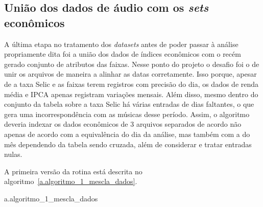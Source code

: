\subsection{União dos dados de áudio com os \textit{sets} econômicos}
\label{c.uniao_economia_audio}

A última etapa no tratamento dos \textit{datasets} antes de poder passar à análise propriamente dita foi a união dos dados de índices econômicos com o recém gerado conjunto de atributos das faixas. Nesse ponto do projeto o desafio foi o de unir os arquivos de maneira a alinhar as datas corretamente. Isso porque, apesar de a taxa Selic e as faixas terem registros com precisão do dia, os dados de renda média e IPCA apenas registram variações mensais. Além disso, mesmo dentro do conjunto da tabela sobre a taxa Selic há várias entradas de dias faltantes, o que gera uma incorrespondência com as músicas desse período. Assim, o algoritmo deveria indexar os dados econômicos de 3 arquivos separados de acordo não apenas de acordo com a equivalência do dia da análise, mas também com a do mês dependendo da tabela sendo cruzada, além de considerar e tratar entradas nulas.

A primeira versão da rotina está descrita no algoritmo~\ref{a.algoritmo_1_mescla_dados}.

\begin{nicealgo}{a.algoritmo_1_mescla_dados}
\naPREAMBLE
{}
\naBODY
\naBEGIN{}
				\naEND{}
			\naEND{}
		\naEND{}
			\naEND{}
		\naEND{}
	\naEND{}
\naEND{}
\end{nicealgo}


